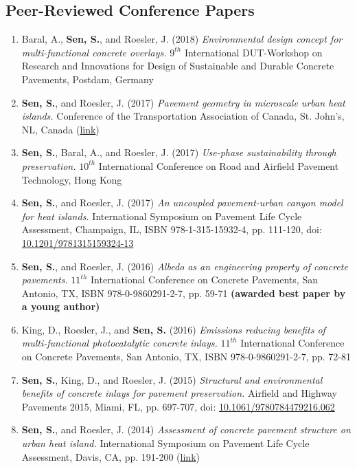 \documentclass[12pt]{article}
\begin{document}
\subsection*{Peer-Reviewed Conference Papers}
\begin{enumerate}[label=(C\arabic*)]
	\item Baral, A., \textbf{Sen, S.}, and Roesler, J. (2018) \textit{Environmental design concept for multi-functional concrete overlays.} $9^{th}$ International DUT-Workshop on Research and Innovations for Design of Sustainable and Durable Concrete Pavements, Postdam, Germany
	\item \textbf{Sen, S.}, and Roesler, J. (2017) \textit{Pavement geometry in microscale urban heat islands.} Conference of the Transportation Association of Canada, St. John’s, NL, Canada (\href{http://www.tac-atc.ca/sites/default/files/conf_papers/sens_-_pavement_geometry_in_microscale_urban_heat_islands.pdf}{link})
	\item \textbf{Sen, S.}, Baral, A., and Roesler, J. (2017) \textit{Use-phase sustainability through preservation.} $10^{th}$ International Conference on Road and Airfield Pavement Technology, Hong Kong
	\item \textbf{Sen, S.}, and Roesler, J. (2017) \textit{An uncoupled pavement-urban canyon model for heat islands.} International Symposium on Pavement Life Cycle Assessment, Champaign, IL, ISBN 978-1-315-15932-4, pp. 111-120, doi: \href{http://dx.doi.org/10.1201/9781315159324-13}{10.1201/9781315159324-13}
	\item \textbf{Sen, S.}, and Roesler, J. (2016) \textit{Albedo as an engineering property of concrete pavements.} $11^{th}$ International Conference on Concrete Pavements, San Antonio, TX, ISBN 978-0-9860291-2-7, pp. 59-71 \textbf{(awarded best paper by a young author)}
	\item King, D., Roesler, J., and \textbf{Sen, S.} (2016) \textit{Emissions reducing benefits of multi-functional photocatalytic concrete inlays.} $11^{th}$ International Conference on Concrete Pavements, San Antonio, TX, ISBN 978-0-9860291-2-7, pp. 72-81
	\item \textbf{Sen, S.}, King, D., and Roesler, J. (2015) \textit{Structural and environmental benefits of concrete inlays for pavement preservation.} Airfield and Highway Pavements 2015, Miami, FL, pp. 697-707, doi: \href{http://dx.doi.org/10.1061/9780784479216.062}{10.1061/9780784479216.062}
	\item \textbf{Sen, S.}, and Roesler, J. (2014) \textit{Assessment of concrete pavement structure on urban heat island.} International Symposium on Pavement Life Cycle Assessment, Davis, CA, pp. 191-200 (\href{http://www.ucprc.ucdavis.edu/p-LCA2014/media/pdf/Papers/LCA14_Urban\%20Heat\%20Island.pdf}{link})
\end{enumerate}
\end{document}
